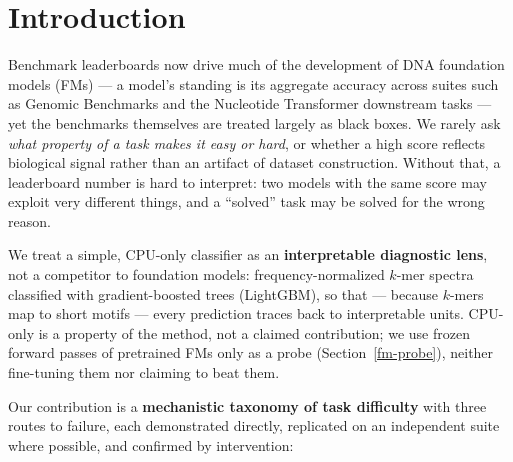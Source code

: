 \documentclass{ws-procs11x85}
\begin{document}


\section{Introduction}\label{introduction}

Benchmark leaderboards now drive much of the development of DNA foundation models
(FMs)\cite{nt,dnabert,dnabert2,hyenadna,caduceus} --- a model's standing is its aggregate accuracy
across suites such as Genomic Benchmarks\cite{gb} and the Nucleotide Transformer downstream
tasks\cite{nt} --- yet the benchmarks themselves are treated largely as black boxes. We rarely ask
\emph{what property of a task makes it easy or hard}, or whether a high score reflects biological signal
rather than an artifact of dataset construction. Without that, a leaderboard number is hard to interpret:
two models with the same score may exploit very different things, and a ``solved'' task may be solved for
the wrong reason.

We treat a simple, CPU-only classifier as an \textbf{interpretable diagnostic lens}, not a competitor to
foundation models: frequency-normalized $k$-mer spectra classified with gradient-boosted trees
(LightGBM\cite{lightgbm}), so that --- because $k$-mers map to short motifs --- every prediction traces
back to interpretable units. CPU-only is a property of the method, not a claimed contribution; we use
frozen forward passes of pretrained FMs only as a probe (Section~\ref{fm-probe}), neither fine-tuning them
nor claiming to beat them.

Our contribution is a \textbf{mechanistic taxonomy of task difficulty} with three routes to failure,
each demonstrated directly, replicated on an independent suite where possible, and confirmed by
intervention:
\end{document}

